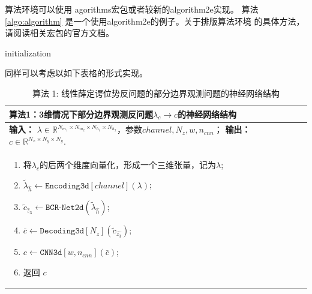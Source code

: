 算法环境可以使用 agorithms宏包或者较新的algorithm2e实现。
算法\ref{algo:algorithm} 是一个使用algorithm2e的例子。关于排版算法环境
的具体方法，请阅读相关宏包的官方文档。

\begin{algorithm}[htb]
  \caption{算法示例}
  \label{algo:algorithm}
  \small
  \SetAlgoLined

  initialization\;
\end{algorithm}

同样可以考虑以如下表格的形式实现。
\begin{table}[H] 
\centering
\begin{tabular}{p{\textwidth}}
\toprule
\textbf{算法1：3维情况下部分边界观测反问题$\lambda_c\rightarrow c$的神经网络结构}  \\%
\midrule
\textbf{输入：} %
$\lambda\in\mathbb{R}^{N_{m_1}\times N_{m_2}\times N_{h_1}\times N_{h_2}}$，参数$channel,N_{z},w,n_{cnn}$；
\textbf{输出：} %
$c\in \mathbb{R}^{N_x\times N_y\times N_y}$. \\[-15pt]%
\begin{enumerate}[1:]
  \item 将$\lambda_c$的后两个维度向量化，形成一个三维张量，记为$\lambda$;
  \item $\tilde{\lambda}_{\hat{h}}\leftarrow\texttt{Encoding3d}[channel](\lambda)$; %
  \item  $\tilde{c}_{\hat{z}_3}\leftarrow\texttt{BCR-Net2d}(\tilde{\lambda}_{\hat{h}}) $; %
  \item $\bar{c}\leftarrow\texttt{Decoding3d}[N_z](\tilde{c}_{\hat{z_3}})$;%
  \item $c\leftarrow\texttt{CNN3d}[w,n_{cnn}](\bar{c})$;%
  \item 返回 $c$ %
\end{enumerate} \\%
\bottomrule
\end{tabular}
\caption*{算法 1: 线性薛定谔位势反问题的部分边界观测问题的神经网络结构}
\end{table}



